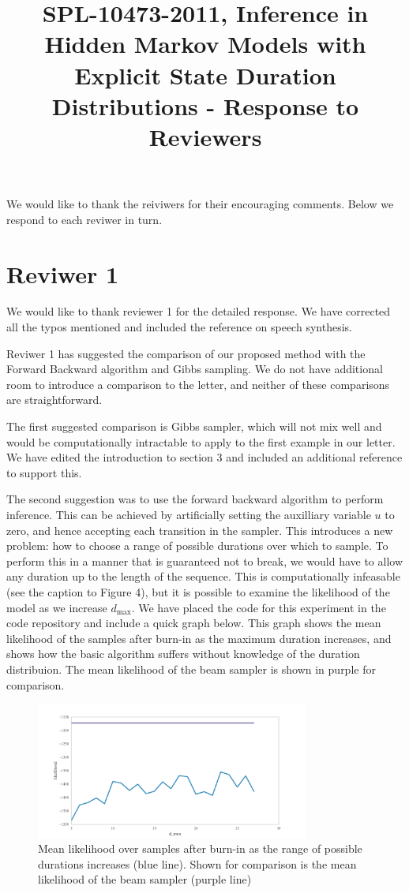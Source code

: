 \documentclass{article}
\title{SPL-10473-2011, Inference in Hidden Markov Models with Explicit State Duration Distributions - Response to Reviewers}
\begin{document}
\maketitle
We would like to thank the reiviwers for their encouraging comments. Below we respond to each reviwer in turn.

\section*{Reviwer 1}

We would like to thank reviewer 1 for the detailed response. We have corrected all the typos mentioned and included the reference on speech synthesis. 

Reviwer 1 has suggested the comparison of our proposed method with the Forward Backward algorithm and Gibbs sampling. We do not have additional room to introduce a comparison to the letter, and neither of these comparisons are straightforward.

The first suggested comparison is Gibbs sampler, which will not mix well and would be computationally intractable to apply to the first example in our letter. We have edited the introduction to section 3 and included an additional reference to support this. 

The second suggestion was to use the forward backward algorithm to perform inference. This can be achieved by artificially setting the auxilliary variable $u$ to zero, and hence accepting each transition in the sampler. This introduces a new problem: how to choose a range of possible durations over which to sample. To perform this in a manner that is guaranteed not to break, we would have to allow any duration up to the length of the sequence. This is computationally infeasable (see the caption to Figure 4), but it is possible to examine the likelihood of the model as we increase $d_\mathrm{max}$. We have placed the code for this experiment in the code repository and include a quick graph below. This graph shows the mean likelihood of the samples after burn-in as the maximum duration increases, and shows how the basic algorithm suffers without knowledge of the duration distribuion. The mean likelihood of the beam sampler is shown in purple for comparison. 

\begin{figure}
	\includegraphics[width=0.8\textwidth]{../pic/likelihood_over_dmax.pdf}
	\caption{Mean likelihood over samples after burn-in as the range of possible durations increases (blue line). Shown for comparison is the mean likelihood of the beam sampler (purple line)}
\end{figure}
\end{document}
